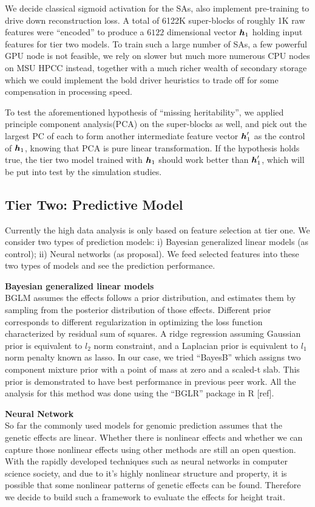 \documentclass[acmtog, authorversion]{acmart}
\begin{document}
We decide classical sigmoid activation for the SAs, also implement pre-training to drive down reconstruction loss. A total of 6122K super-blocks of roughly 1K raw features were ``encoded'' to produce a $6122$ dimensional vector $\boldsymbol{h}_1$ holding input features for tier two models. To train such a large number of SAs, a few powerful GPU node is not feasible, we rely on slower but much more numerous CPU nodes on MSU HPCC instead, together with a much richer wealth of secondary storage which we could implement the bold driver heuristics to trade off for some compensation in processing speed.

To test the aforementioned hypothesis of ``missing heritability'', we applied principle component analysis(PCA) on the super-blocks as well, and pick out the largest PC of each to form another intermediate feature vector $\boldsymbol{h}_1^{\prime}$ as the control of $\boldsymbol{h}_1$, knowing that PCA is pure linear transformation. If the hypothesis holds true, the tier two model trained with $\boldsymbol{h}_1$ should work better than $\boldsymbol{h}_1^\prime$, which will be put into test by the simulation studies.

\subsection{Tier Two: Predictive Model}
Currently the high data analysis is only based on feature selection at tier one. We consider two types of prediction models: i) Bayesian generalized linear models (as control); ii) Neural networks (as proposal). We feed selected features into these two types of models and see the prediction performance.

\noindent \textbf{Bayesian generalized linear models} \\
BGLM assumes the effects follows a prior distribution, and estimates them by sampling from the posterior distribution of those effects. Different prior corresponds to different regularization in optimizing the loss function characterized by residual sum of squares. A ridge regression assuming Gaussian prior is equivalent to $l_2$ norm constraint, and a Laplacian prior is equivalent to $l_1$ norm penalty known as lasso. In our case, we tried ``BayesB'' which assigns two component mixture prior with a point of mass at zero and a scaled-t slab. This prior is demonstrated to have best performance in previous peer work. All the analysis for this method was done using the ``BGLR'' package in R [ref]. 

\noindent \textbf{Neural Network} \\
So far the commonly used models for genomic prediction assumes that the genetic effects are linear. Whether there is nonlinear effects and whether we can capture those nonlinear effects using other methods are still an open question. With the rapidly developed techniques such as neural networks in computer science society, and due to it’s highly nonlinear structure and property, it is possible that some nonlinear patterns of genetic effects can be found. Therefore we decide to build such a framework to evaluate the effects for height trait.
\end{document}
